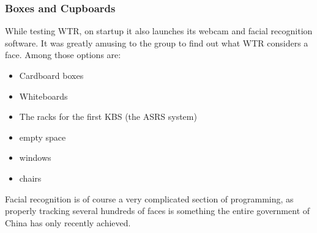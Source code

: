 \subsubsection{Boxes and Cupboards}
While testing WTR, on startup it also launches its webcam and facial recognition software.
It was greatly amusing to the group to find out what WTR considers a face.
Among those options are:
\begin{itemize}
\item Cardboard boxes
\item Whiteboards
\item The racks for the first KBS (the ASRS system)
\item empty space
\item windows
\item chairs
\end{itemize}
Facial recognition is of course a very complicated section of programming, as properly tracking several hundreds of faces is something the entire government of China has only recently achieved.

